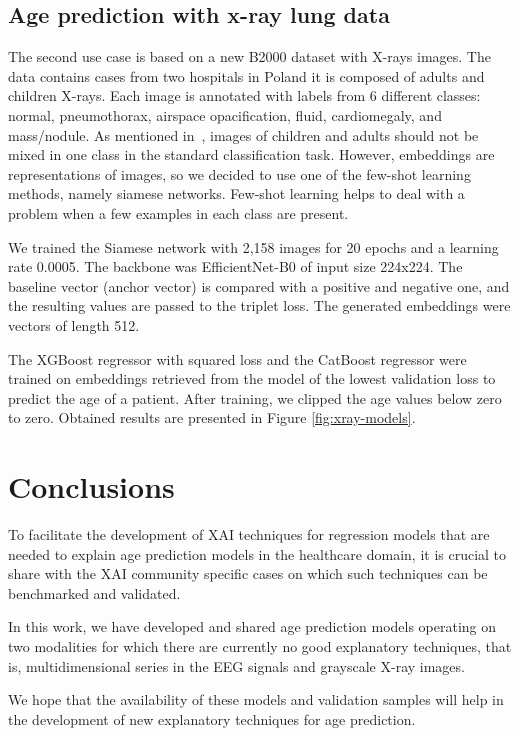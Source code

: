 \documentclass[letterpaper]{article} %
\begin{document}
\subsection{Age prediction with x-ray lung data}

The second use case is based on a new B2000 dataset with X-rays images. The data contains cases from two hospitals in Poland it is composed of adults and children X-rays. Each image is annotated with labels from 6 different classes: normal, pneumothorax, airspace opacification, fluid, cardiomegaly, and mass/nodule. As mentioned in~\cite{checklist}, images of children and adults should not be mixed in one class in the standard classification task. However, embeddings are representations of images, so we decided to use one of the few-shot learning methods, namely siamese networks. Few-shot learning helps to deal with a problem when a few examples in each class are present.

We trained the Siamese network with 2,158 images for 20 epochs and a learning rate 0.0005. The backbone was EfficientNet-B0 of input size 224x224. The baseline vector (anchor vector) is compared with a positive and negative one, and the resulting values are passed to the triplet loss. The generated embeddings were vectors of length 512.

The XGBoost regressor with squared loss and the CatBoost regressor were trained on embeddings retrieved from the model of the lowest validation loss to predict the age of a patient. After training, we clipped the age values below zero to zero. Obtained results are presented in Figure \ref{fig:xray-models}.

\section{Conclusions}

To facilitate the development of XAI techniques for regression models that are needed to explain age prediction models in the healthcare domain, it is crucial to share with the XAI community specific cases on which such techniques can be benchmarked and validated.

In this work, we have developed and shared age prediction models operating on two modalities for which there are currently no good explanatory techniques, that is, multidimensional series in the EEG signals and grayscale X-ray images. 

We hope that the availability of these models and validation samples will help in the development of new explanatory techniques for age prediction.
\end{document}
